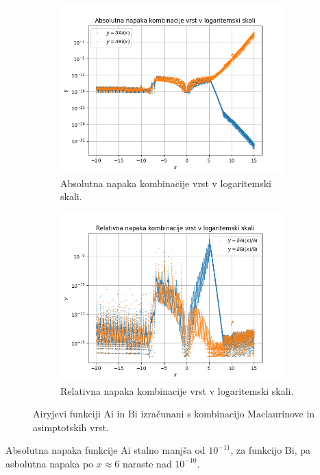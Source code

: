 \documentclass[a4paper, 12pt, slovene]{article}
\newcommand{\Ai}{\mathrm{Ai}}
\newcommand{\Bi}{\mathrm{Bi}}
\begin{document}
\begin{figure}[H]
\centering
\begin{subfigure}{0.49\textwidth}
	\centering
	\includegraphics[width=0.95\textwidth]{grafi/kombinacija_abs_err.png}
	\caption{Absolutna napaka kombinacije vrst v logaritemski skali.}
	\label{fig-kom-abserr}
\end{subfigure}%
\begin{subfigure}{0.49\textwidth}
	\centering
	\includegraphics[width=0.95\textwidth]{grafi/kombinacija_rel_err.png}
	\caption{Relativna napaka kombinacije vrst v logaritemski skali.}
	\label{fig-kom-relerr}
\end{subfigure}
\caption{Airyjevi funkciji $\Ai$ in $\Bi$ izračunani s kombinacijo Maclaurinove in asimptotskih vrst.}
\label{fig-kombinacija}
\end{figure}
Absolutna napaka funkcije $\Ai$ stalno manjša od $10^{-11}$, za funkcijo $\Bi$, pa asbolutna napaka po $x\approx 6$ naraste nad $10^{-10}$. \par\vspace{5mm}
\end{document}
